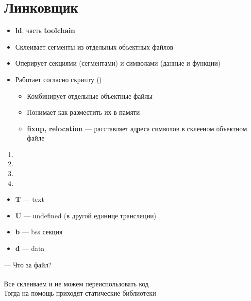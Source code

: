 \documentclass[../../lectures.tex]{subfiles}
\begin{document}
\section{Линковщик}
\begin{itemize}
    \item \textbf{ld}, часть \textbf{toolchain}
    \item Склеивает сегменты из отдельных объектных файлов
    \item Оперирует секциями (сегментами) и символами (данные и функции)
    \item Работает согласно скрипту ()
        \begin{itemize}
            \item Комбинирует отдельные объектные файлы
            \item Понимает как разместить их в памяти
            \item \textbf{fixup, relocation} --- расставляет адреса символов в склееном объектном файле
        \end{itemize}
\end{itemize}
\begin{enumerate}
    \item {}
    \item {}
    \item {}
    \item {}
\end{enumerate}
\begin{itemize}
    \item \textbf{T} --- text
    \item \textbf{U} --- undefined (в другой единице трансляции)
    \item \textbf{b} --- bss секция
    \item \textbf{d} --- data
\end{itemize}
 --- Что за файл?\\
\\
Все склеиваем и не можем переиспользовать код\\
Тогда на помощь приходят статические библиотеки
\end{document}
